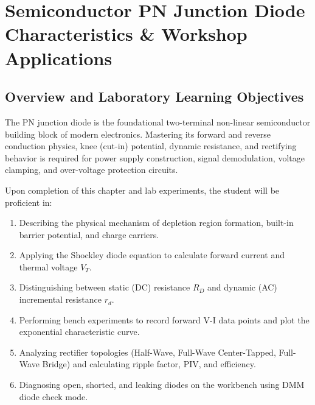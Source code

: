 \chapter{Semiconductor PN Junction Diode Characteristics \& Workshop Applications}
\label{chap:diodes}

\section{Overview and Laboratory Learning Objectives}
The PN junction diode is the foundational two-terminal non-linear semiconductor building block of modern electronics. Mastering its forward and reverse conduction physics, knee (cut-in) potential, dynamic resistance, and rectifying behavior is required for power supply construction, signal demodulation, voltage clamping, and over-voltage protection circuits.

\begin{important}
Upon completion of this chapter and lab experiments, the student will be proficient in:
\begin{enumerate}[leftmargin=1.5em]
    \item Describing the physical mechanism of depletion region formation, built-in barrier potential, and charge carriers.
    \item Applying the Shockley diode equation to calculate forward current and thermal voltage $V_T$.
    \item Distinguishing between static (DC) resistance $R_D$ and dynamic (AC) incremental resistance $r_d$.
    \item Performing bench experiments to record forward V-I data points and plot the exponential characteristic curve.
    \item Analyzing rectifier topologies (Half-Wave, Full-Wave Center-Tapped, Full-Wave Bridge) and calculating ripple factor, PIV, and efficiency.
    \item Diagnosing open, shorted, and leaking diodes on the workbench using DMM diode check mode.
\end{enumerate}
\end{important}

